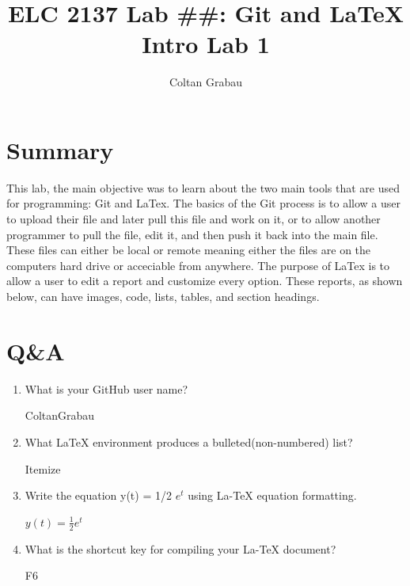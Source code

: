 \documentclass[11pt]{article}
\begin{document}
	
	\title{ELC 2137 Lab \#\#: Git and LaTeX Intro Lab 1}
	\author{Coltan Grabau}
	
	\maketitle
	
	
	\section*{Summary}
	
	This lab, the main objective was to learn about the two main tools that are used for programming: Git and LaTex. The basics of the Git process is to allow a user to upload their file and later pull this file and work on it, or to allow another programmer to pull the file, edit it, and then push it back into the main file. These files can either be local or remote meaning either the files are on the computers hard drive or acceciable from anywhere. The purpose of LaTex is to allow a user to edit a report and customize every option. These reports, as shown below, can have images, code, lists, tables, and section headings.
	
	
	\section*{Q\&A}
	
	\begin{enumerate}
		\item What is your GitHub user name?
		
		ColtanGrabau
		
		\item What  LaTeX  environment  produces  a  bulleted(non-numbered) list?
		
		Itemize 
		
		\item Write  the  equation y(t) = 1/2 $e^t$ using  La-TeX equation formatting.
		
		$y(t) = \frac{1}{2}e^t$
		
		\item What is the shortcut key for compiling your La-TeX document?
		
		F6
		
	\end{enumerate}
	
	\newpage
\end{document}
